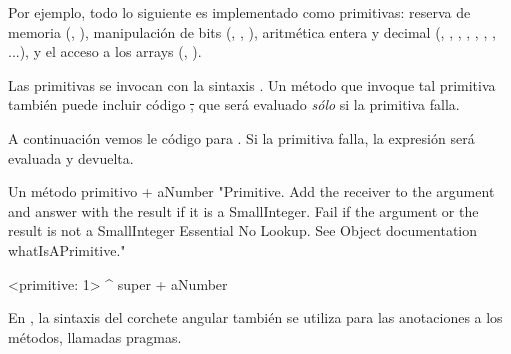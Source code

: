 \documentclass[a4paper,10pt,twoside]{book}
\begin{document}
Por ejemplo, todo lo siguiente es implementado como primitivas:
reserva de memoria (, ),
manipulación de bits (, , ),
aritmética entera y decimal (\ct{+}, \ct{-},  \ct{<},  \ct{>}, \ct{*}, \ct{/ }, \ct{=}, \ct{==}...),
y el acceso a los arrays (, ).

Las primitivas se invocan con la sintaxis .
Un método que invoque tal primitiva también puede incluir código \st, que será evaluado \emph{sólo} si la primitiva falla.

A continuación vemos le código para .
Si la primitiva falla, la expresión  será evaluada y devuelta.

\begin{method}[primitive]{Un método primitivo}
+ aNumber 
  "Primitive. Add the receiver to the argument and answer with the result
  if it is a SmallInteger. Fail if the argument or the result is not a
  SmallInteger  Essential  No Lookup. See Object documentation whatIsAPrimitive."

  <primitive: 1>
  ^ super + aNumber
\end{method}





En \pharo, la sintaxis del corchete angular también se utiliza para las anotaciones a los métodos, llamadas pragmas.
\end{document}

